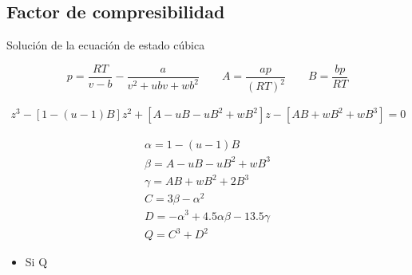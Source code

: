 \subsection{Factor de compresibilidad}

Solución de la ecuación de estado cúbica

\begin{equation}
p=\frac{RT}{v-b} - \frac{a}{v^2 + ubv+ wb^2}
\qquad
A=\frac{ap}{(RT)^2}
\qquad
B=\frac{bp}{RT}
\end{equation}

\begin{eqnarray}
z^3-\left[1-(u-1)B\right]z^2+ \left[A-uB-uB^2 + wB^2\right]z-\left[AB+wB^2+wB^3\right]=0
\end{eqnarray}


\begin{eqnarray}
\alpha = 1-(u-1)B\\
\beta = A -uB-uB^2+wB^3\\
\gamma = AB +wB^2+ 2B^3\\
C = 3\beta - \alpha^2\\
D= - \alpha^3+ 4.5 \alpha \beta -13.5 \gamma\\
Q=C^3+D^2
\end{eqnarray}


\begin{itemize}
\item Si Q 
\end{itemize}